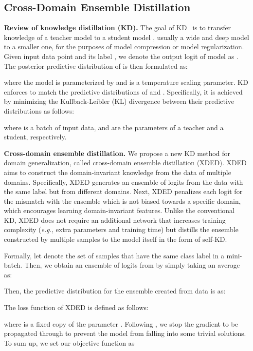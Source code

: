 \documentclass[runningheads]{llncs}
\def\eg{\emph{e.g.}}
\begin{document}
\subsection{Cross-Domain Ensemble Distillation}
\noindent \textbf{Review of knowledge distillation (KD).}
The goal of KD~\cite{hinton2015distilling} is to transfer knowledge of a teacher model  to a student model , usually a wide and deep model to a smaller one, for the purposes of model compression or model regularization. Given input data point  and its label , we denote the output logit of model as . The posterior predictive distribution of  is then formulated as:

where the model is parameterized by  and  is a temperature scaling parameter. KD enforces to match the predictive distributions of  and . Specifically, it is achieved by minimizing the Kullback-Leibler (KL) divergence between their predictive distributions as follows:

where  is a batch of input data,  and  are the parameters of a teacher and a student, respectively.




\noindent \textbf{Cross-domain ensemble distillation.} We propose a new KD method for domain generalization, called cross-domain ensemble distillation (XDED). XDED aims to construct the domain-invariant knowledge from the data of multiple domains. Specifically, XDED generates an ensemble of logits from the data with the same label but from different domains. Next, XDED penalizes each logit for the mismatch with the ensemble which is not biased towards a specific domain, which encourages learning domain-invariant features.
Unlike the conventional KD, XDED does not require an additional network that increases training complexity (\eg, extra parameters and training time) but distills the ensemble constructed by multiple samples to the model itself in the form of self-KD. 


Formally, let  denote the set of samples that have the same class label  in a mini-batch. Then, we obtain an ensemble of logits from  by simply taking an average as:

Then, the predictive distribution for the ensemble created from data  is as:

The loss function of XDED is defined as follows:

where  is a fixed copy of the parameter . Following \cite{miyato2018virtual,yun2020regularizing}, we stop the gradient to be propagated through  to prevent the model from falling into some trivial solutions. To sum up, we set our objective function as
\end{document}
